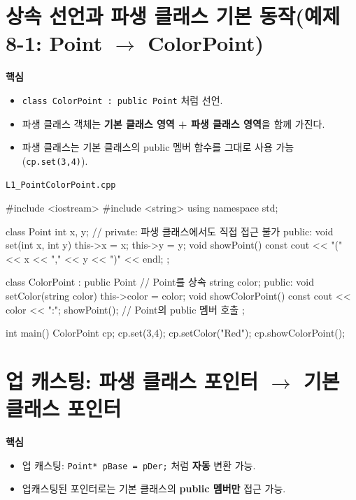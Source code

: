 \documentclass[11pt,a4paper]{article}
\newcommand{\filetag}[1]{\texttt{\color{Accent}#1}}
\begin{document}
\section{상속 선언과 파생 클래스 기본 동작(예제 8-1: Point $\rightarrow$ ColorPoint)}
\begin{GoalBox}
\textbf{핵심}
\begin{itemize}[leftmargin=18pt]
  \item \texttt{class ColorPoint : public Point} 처럼 선언.
  \item 파생 클래스 객체는 \textbf{기본 클래스 영역 + 파생 클래스 영역}을 함께 가진다.
  \item 파생 클래스는 기본 클래스의 public 멤버 함수를 그대로 사용 가능(\texttt{cp.set(3,4)}).
\end{itemize}
\end{GoalBox}

\noindent\filetag{L1\_PointColorPoint.cpp}
\begin{cppcode}
#include <iostream>
#include <string>
using namespace std;

class Point {
    int x, y; // private: 파생 클래스에서도 직접 접근 불가
public:
    void set(int x, int y) { this->x = x; this->y = y; }
    void showPoint() const { cout << "(" << x << "," << y << ")" << endl; }
};

class ColorPoint : public Point { // Point를 상속
    string color;
public:
    void setColor(string color) { this->color = color; }
    void showColorPoint() const {
        cout << color << ":";
        showPoint(); // Point의 public 멤버 호출
    }
};

int main() {
    ColorPoint cp;
    cp.set(3,4);
    cp.setColor("Red");
    cp.showColorPoint();
}
\end{cppcode}

\section{업 캐스팅: 파생 클래스 포인터 $\rightarrow$ 기본 클래스 포인터}
\begin{GoalBox}
\textbf{핵심}
\begin{itemize}[leftmargin=18pt]
  \item 업 캐스팅: \texttt{Point* pBase = pDer;} 처럼 \textbf{자동} 변환 가능.
  \item 업캐스팅된 포인터로는 기본 클래스의 \textbf{public 멤버만} 접근 가능.
\end{itemize}
\end{GoalBox}
\end{document}
